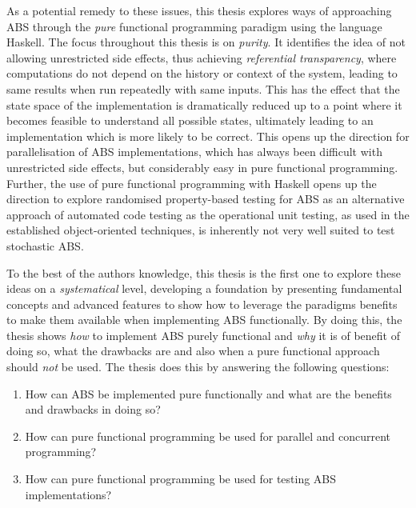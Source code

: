 As a potential remedy to these issues, this thesis explores ways of approaching ABS through the \textit{pure} functional programming paradigm using the language Haskell. The focus throughout this thesis is on \textit{purity}. It identifies the idea of not allowing unrestricted side effects, thus achieving \textit{referential transparency}, where computations do not depend on the history or context of the system, leading to same results when run repeatedly with same inputs. This has the effect that the state space of the implementation is dramatically reduced up to a point where it becomes feasible to understand all possible states, ultimately leading to an implementation which is more likely to be correct. This opens up the direction for parallelisation of ABS implementations, which has always been difficult with unrestricted side effects, but considerably easy in pure functional programming. Further, the use of pure functional programming with Haskell opens up the direction to explore randomised property-based testing for ABS as an alternative approach of automated code testing as the operational unit testing, as used in the established object-oriented techniques, is inherently not very well suited to test stochastic ABS.

To the best of the authors knowledge, this thesis is the first one to explore these ideas on a \textit{systematical} level, developing a foundation by presenting fundamental concepts and advanced features to show how to leverage the paradigms benefits \cite{hudak_history_2007} to make them available when implementing ABS functionally. By doing this, the thesis shows \textit{how} to implement ABS purely functional and \textit{why} it is of benefit of doing so, what the drawbacks are and also when a pure functional approach should \textit{not} be used. The thesis does this by answering the following questions:

\begin{enumerate}
	\item How can ABS be implemented pure functionally and what are the benefits and drawbacks in doing so?
	\item How can pure functional programming be used for parallel and concurrent programming? 
	\item How can pure functional programming be used for testing ABS implementations?
\end{enumerate}

\medskip

